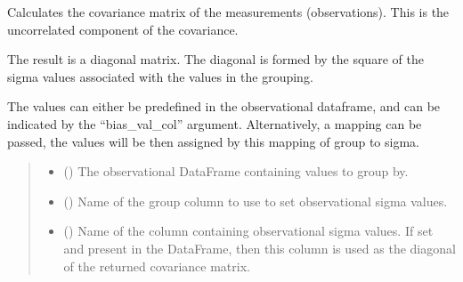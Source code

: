\documentclass[letterpaper,10pt,english]{sphinxmanual}
\begin{document}

\begin{fulllineitems}
\label{\detokenize{error_covariance:glomar_gridding.error_covariance.uncorrelated_components}}
\pysigstartsignatures
\pysiglinewithargsret
{}
{\sphinxparamcomma {}\sphinxparamcomma {}\sphinxparamcomma {}}
{}
\pysigstopsignatures
\sphinxAtStartPar
Calculates the covariance matrix of the measurements (observations). This
is the uncorrelated component of the covariance.

\sphinxAtStartPar
The result is a diagonal matrix. The diagonal is formed by the square of the
sigma values associated with the values in the grouping.

\sphinxAtStartPar
The values can either be pre\sphinxhyphen{}defined in the observational dataframe, and
can be indicated by the “bias\_val\_col” argument. Alternatively, a mapping
can be passed, the values will be then assigned by this mapping of group to
sigma.
\begin{quote}\begin{description}
\begin{itemize}
\item {}
\sphinxAtStartPar
{} () \textendash{} The observational DataFrame containing values to group by.

\item {}
\sphinxAtStartPar
{} () \textendash{} Name of the group column to use to set observational sigma values.

\item {}
\sphinxAtStartPar
{} (\sphinxstyleliteralemphasis{\sphinxupquote{ | }}) \textendash{} Name of the column containing observational sigma values. If set and
present in the DataFrame, then this column is used as the diagonal of
the returned covariance matrix.


\end{itemize}
\end{description}
\end{quote}
\end{fulllineitems}
\end{document}
